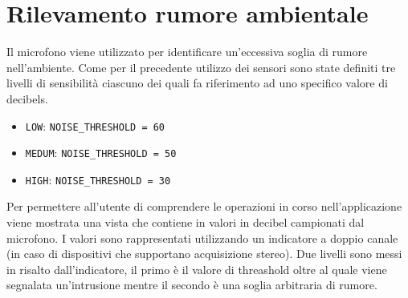 \section{Rilevamento rumore ambientale}
Il microfono viene utilizzato per identificare un'eccessiva soglia di rumore nell'ambiente. Come per il precedente utilizzo dei sensori sono state definiti tre livelli di sensibilità ciascuno dei quali fa riferimento ad uno specifico valore di decibels.

\begin{itemize}
	\item \texttt{LOW}: \texttt{NOISE\_THRESHOLD = 60}
	\item \texttt{MEDUM}:  \texttt{NOISE\_THRESHOLD = 50}
	\item \texttt{HIGH}:  \texttt{NOISE\_THRESHOLD = 30}
\end{itemize}

Per permettere all'utente di comprendere le operazioni in corso nell'applicazione viene mostrata una vista che contiene in valori in decibel campionati dal microfono. I valori sono rappresentati utilizzando un indicatore a doppio canale (in caso di dispositivi che supportano acquisizione stereo). Due livelli sono messi in risalto dall'indicatore, il primo è il valore di threashold oltre al quale viene segnalata un'intrusione mentre il secondo è una soglia arbitraria di rumore.

